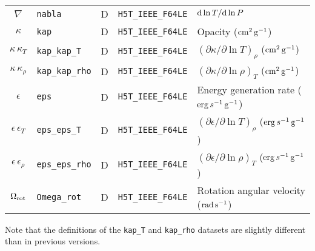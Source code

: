 \documentclass{article}
\newcommand{\diff}{\ensuremath{{\rm d}}}
\newcommand{\cm}{\ensuremath{{\rm cm}}}
\newcommand{\gram}{\ensuremath{{\rm g}}}
\newcommand{\second}{\ensuremath{{\rm s}}}
\newcommand{\erg}{\ensuremath{{\rm erg}}}
\begin{document}
\begin{table}[h!]
\begin{tabular}{|c|l|c|l|l|}
$\nabla$          & \texttt{nabla}        & D & \texttt{H5T\_IEEE\_F64LE} & $\diff \ln T/\diff \ln P$ \\
$\kappa$          & \texttt{kap}       & D &  \texttt{H5T\_IEEE\_F64LE} & Opacity ($\cm^{2}\,\gram^{-1}$) \\
$\kappa\,\kappa_{T}$      & \texttt{kap\_kap\_T}     & D &  \texttt{H5T\_IEEE\_F64LE} & $(\partial \kappa/\partial \ln T)_{\rho}$ ($\cm^{2}\,\gram^{-1}$) \\
$\kappa\,\kappa_{\rho}$   & \texttt{kap\_kap\_rho}   & D &  \texttt{H5T\_IEEE\_F64LE} & $(\partial \kappa/\partial \ln \rho)_{T}$ ($\cm^{2}\,\gram^{-1}$) \\
$\epsilon$        & \texttt{eps}      & D &  \texttt{H5T\_IEEE\_F64LE} & Energy generation rate ($\erg\,s^{-1}\,\gram^{-1}$) \\
$\epsilon\,\epsilon_{T}$    & \texttt{eps\_eps\_T}   & D &  \texttt{H5T\_IEEE\_F64LE} & $(\partial \epsilon/\partial \ln T)_{\rho}$ ($\erg\,s^{-1}\,\gram^{-1}$) \\
$\epsilon\,\epsilon_{\rho}$ & \texttt{eps\_eps\_rho} & D &  \texttt{H5T\_IEEE\_F64LE} & $(\partial \epsilon/\partial \ln \rho)_{T}$ ($\erg\,s^{-1}\,\gram^{-1}$) \\
$\Omega_{\rm rot}$ & \texttt{Omega\_rot}   & D & \texttt{H5T\_IEEE\_F64LE} & Rotation angular velocity (${\rm rad}\,\second^{-1}$) \\  \hline
\end{tabular}
\end{table}

Note that the definitions of the \texttt{kap\_T} and \texttt{kap\_rho} datasets are
slightly different than in previous versions.
\end{document}
